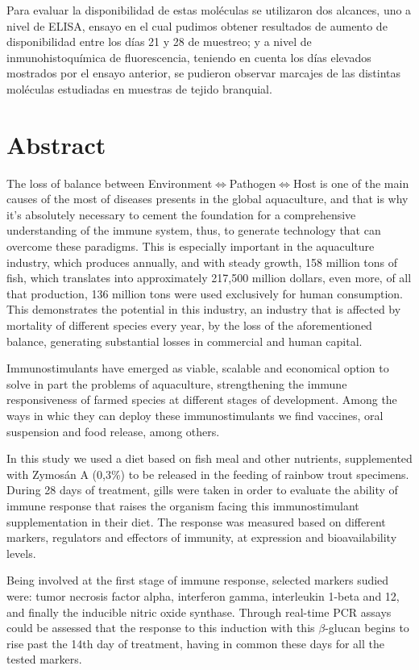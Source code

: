 \documentclass[12pt,letterpaper,oneside]{scrbook}
\begin{document}
Para evaluar la disponibilidad de estas moléculas se utilizaron dos
alcances, uno a nivel de ELISA, ensayo en el cual pudimos obtener
resultados de aumento de disponibilidad entre los días 21 y 28 de
muestreo; y a nivel de inmunohistoquímica de fluorescencia, teniendo en
cuenta los días elevados mostrados por el ensayo anterior, se pudieron
observar marcajes de las distintas moléculas estudiadas en muestras de
tejido branquial.

\chapter{Abstract}

The loss of balance between
Environment\(\Leftrightarrow\)Pathogen\(\Leftrightarrow\)Host is one of
the main causes of the most of diseases presents in the global
aquaculture, and that is why it's absolutely necessary to cement the
foundation for a comprehensive understanding of the immune system, thus,
to generate technology that can overcome these paradigms. This is
especially important in the aquaculture industry, which produces
annually, and with steady growth, 158 million tons of fish, which
translates into approximately 217,500 million dollars, even more, of all
that production, 136 million tons were used exclusively for human
consumption. This demonstrates the potential in this industry, an
industry that is affected by mortality of different species every year,
by the loss of the aforementioned balance, generating substantial losses
in commercial and human capital.

Immunostimulants have emerged as viable, scalable and economical option
to solve in part the problems of aquaculture, strengthening the immune
responsiveness of farmed species at different stages of development.
Among the ways in whic they can deploy these immunostimulants we find
vaccines, oral suspension and food release, among others.

In this study we used a diet based on fish meal and other nutrients,
supplemented with Zymosán A (0,3\%) to be released in the feeding of
rainbow trout specimens. During 28 days of treatment, gills were taken
in order to evaluate the ability of immune response that raises the
organism facing this immunostimulant supplementation in their diet. The
response was measured based on different markers, regulators and
effectors of immunity, at expression and bioavailability levels.

Being involved at the first stage of immune response, selected markers
sudied were: tumor necrosis factor alpha, interferon gamma, interleukin
1-beta and 12, and finally the inducible nitric oxide synthase. Through
real-time PCR assays could be assessed that the response to this
induction with this \(\beta\)-glucan begins to rise past the 14th day of
treatment, having in common these days for all the tested markers.
\end{document}
